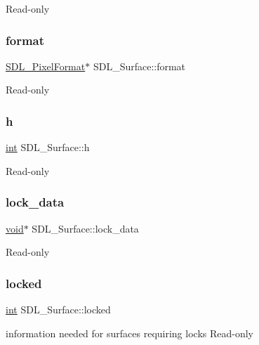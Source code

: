Read-\/only \mbox{\label{struct_s_d_l___surface_a0a90721f947c10c3b79e02ccb419ca62}} 
\subsubsection{\texorpdfstring{format}{format}}
{\footnotesize\ttfamily \mbox{\hyperlink{struct_s_d_l___pixel_format}{S\+D\+L\+\_\+\+Pixel\+Format}}$\ast$ S\+D\+L\+\_\+\+Surface\+::format}

Read-\/only \mbox{\label{struct_s_d_l___surface_af33bcf87a1f5e10a99b3c7e8626b38c8}} 
\subsubsection{\texorpdfstring{h}{h}}
{\footnotesize\ttfamily \mbox{\hyperlink{warnings_8h_a74f207b5aa4ba51c3a2ad59b219a423b}{int}} S\+D\+L\+\_\+\+Surface\+::h}

Read-\/only \mbox{\label{struct_s_d_l___surface_a0afacfb933b54a9af0846a307a6924fb}} 
\subsubsection{\texorpdfstring{lock\_data}{lock\_data}}
{\footnotesize\ttfamily \mbox{\hyperlink{_s_d_l__opengles2__gl2ext_8h_ae5d8fa23ad07c48bb609509eae494c95}{void}}$\ast$ S\+D\+L\+\_\+\+Surface\+::lock\+\_\+data}

Read-\/only \mbox{\label{struct_s_d_l___surface_a5022edaeea1c0a055fa5d6dccba41de2}} 
\subsubsection{\texorpdfstring{locked}{locked}}
{\footnotesize\ttfamily \mbox{\hyperlink{warnings_8h_a74f207b5aa4ba51c3a2ad59b219a423b}{int}} S\+D\+L\+\_\+\+Surface\+::locked}

information needed for surfaces requiring locks Read-\/only \mbox{\label{struct_s_d_l___surface_a8c1ecad399b0d4f525b1a53b6ee9393f}} 
